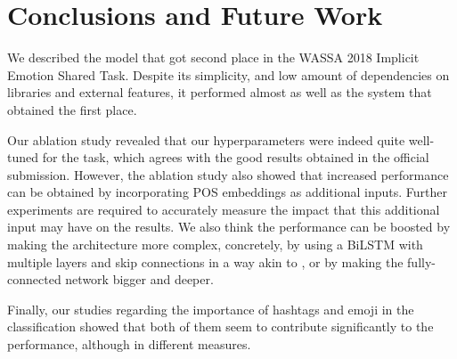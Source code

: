 \documentclass[11pt,a4paper]{article}
\begin{document}
\section{Conclusions and Future Work}

We described the model that got second place in the WASSA 2018 Implicit Emotion Shared Task. Despite its simplicity, and low amount of dependencies on libraries and external features, it performed almost as well as the system that obtained the first place.

Our ablation study revealed that our hyperparameters were indeed quite well-tuned for the task, which agrees with the good results obtained in the official submission. However, the ablation study also showed that increased performance can be obtained by incorporating POS embeddings as additional inputs. Further experiments are required to accurately measure the impact that this additional input may have on the results. We also think the performance can be boosted by making the architecture more complex, concretely, by using a BiLSTM with multiple layers and skip connections in a way akin to \cite{peters2018deep}, or by making the fully-connected network bigger and deeper.

Finally, our studies regarding the importance of hashtags and emoji in the classification showed that both of them seem to contribute significantly to the performance, although in different measures. 



\end{document}
